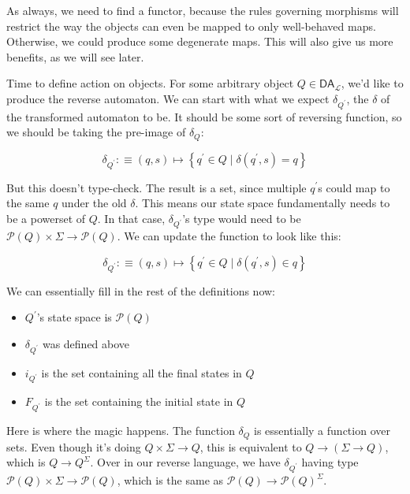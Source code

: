\documentclass{article}
\theoremstyle{plain}
\theoremstyle{definition}
\begin{document}
As always, we need to find a functor, because the rules governing morphisms will restrict the way the objects can even be mapped to only well-behaved maps. Otherwise, we could produce some degenerate maps. This will also give us more benefits, as we will see later.

Time to define action on objects. For some arbitrary object \ensuremath{Q \in {\mathsf{DA}}_{\mathcal{L}}}, we'd like to produce the reverse automaton. We can start with what we expect \ensuremath{{\delta }_{{Q}^{'}}}, the \ensuremath{\delta} of the transformed automaton to be. It should be some sort of reversing function, so we should be taking the pre-image of \ensuremath{{\delta }_{Q}}:

\[
{\delta }_{{Q}^{'}} :\equiv \left( q, s \right) \mapsto \left\{ {q}^{'} \in Q \mid \delta \left( {q}^{'}, s \right) = q \right\}
\]

But this doesn't type-check. The result is a set, since multiple \ensuremath{{q}^{'}}s could map to the same \ensuremath{q} under the old \ensuremath{\delta}. This means our state space fundamentally needs to be a powerset of \ensuremath{Q}. In that case, \ensuremath{{\delta }_{{Q}^{'}}}'s type would need to be \ensuremath{\mathcal{P}\left( Q \right) \times \Sigma \rightarrow \mathcal{P}\left( Q \right)}. We can update the function to look like this:

\[
{\delta }_{{Q}^{'}} :\equiv \left( q, s \right) \mapsto \left\{ {q}^{'} \in Q \mid \delta \left( {q}^{'}, s \right) \in q \right\}
\]\label{preImageDelta} 

We can essentially fill in the rest of the definitions now:

\begin{itemize}
\item \ensuremath{{Q}^{'}}'s state space is \ensuremath{\mathcal{P}\left( Q \right)}
\item \ensuremath{{\delta }_{{Q}^{'}}} was defined above
\item \ensuremath{{i}_{{Q}^{'}}} is the set containing all the final states in \ensuremath{Q}
\item \ensuremath{{F}_{{Q}^{'}}} is the set containing the initial state in \ensuremath{Q}
\end{itemize}


Here is where the magic happens. The function \ensuremath{{\delta }_{Q}} is essentially a function over sets. Even though it's doing \ensuremath{Q \times \Sigma \rightarrow Q}, this is equivalent to \ensuremath{Q \rightarrow \left( \Sigma \rightarrow Q \right)}, which is \ensuremath{Q \rightarrow {Q}^{\Sigma }}. Over in our reverse language, we have \ensuremath{{\delta }_{{Q}^{'}}} having type \ensuremath{\mathcal{P}\left( Q \right) \times \Sigma \rightarrow \mathcal{P}\left( Q \right)}, which is the same as \ensuremath{\mathcal{P}\left( Q \right) \rightarrow {\mathcal{P}\left( Q \right)}^{\Sigma }}.
\end{document}

